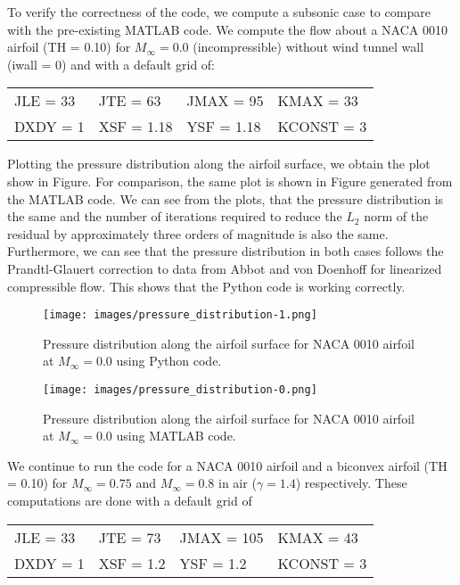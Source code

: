 To verify the correctness of the code, we compute a subsonic case to compare with the pre-existing MATLAB code. We compute the flow about a NACA 0010 airfoil (TH = 0.10) for $M_\infty = 0.0$ (incompressible) without wind tunnel wall (iwall = 0) and with a default grid of:

\begin{center}
\begin{tabular}{@{} l l l l @{}}
    JLE = 33  & JTE = 63  & JMAX = 95  & KMAX = 33 \\
    DXDY = 1  & XSF = 1.18  & YSF = 1.18  & KCONST = 3
\end{tabular}    
\end{center}

Plotting the pressure distribution along the airfoil surface, we obtain the plot show in Figure. For comparison, the same plot is shown in Figure generated from the MATLAB code. We can see from the plots, that the pressure distribution is the same and the number of iterations required to reduce the $L_2$ norm of the residual by approximately three orders of magnitude is also the same. Furthermore, we can see that the pressure distribution in both cases follows the Prandtl-Glauert correction to data from Abbot and von Doenhoff for linearized compressible flow. This shows that the Python code is working correctly.

\begin{figure}
    \centering
    \texttt{[image: images/pressure\_distribution-1.png]}
    \caption{Pressure distribution along the airfoil surface for NACA 0010 airfoil at $M_\infty = 0.0$ using Python code.}
    \label{fig:pressure_distribution-1}
\end{figure}

\begin{figure}
    \centering
    \texttt{[image: images/pressure\_distribution-0.png]}
    \caption{Pressure distribution along the airfoil surface for NACA 0010 airfoil at $M_\infty = 0.0$ using MATLAB code.}
    \label{fig:pressure_distribution-0}
\end{figure}



We continue to run the code for a NACA 0010 airfoil and a biconvex airfoil (TH = 0.10) for $M_\infty = 0.75$ and $M_\infty = 0.8$ in air ($\gamma = 1.4$) respectively. These computations are done with a default grid of

\begin{center}
    \begin{tabular}{@{} l l l l @{}}
        JLE = 33  & JTE = 73  & JMAX = 105  & KMAX = 43 \\
        DXDY = 1  & XSF = 1.2  & YSF = 1.2  & KCONST = 3
    \end{tabular}    
\end{center}


